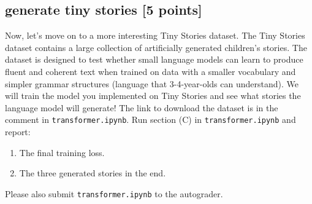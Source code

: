 \documentclass[lang=cn,11pt]{elegantbook}
\begin{document}
\subsection*{generate tiny stories [5 points]}
Now, let's move on to a more interesting Tiny Stories dataset. The Tiny Stories dataset contains a large collection of artificially generated children's stories. The dataset is designed to test whether small language models can learn to produce fluent and coherent text when trained on data with a smaller vocabulary and simpler grammar structures (language that 3-4-year-olds can understand). We will train the model you implemented on Tiny Stories and see what stories the language model will generate! 
The link to download the dataset is in the comment in \texttt{transformer.ipynb}. Run section (C) in \texttt{transformer.ipynb} and report:
\begin{enumerate}
    \item The final training loss.
    \item The three generated stories in the end.
\end{enumerate}
Please also submit \texttt{transformer.ipynb} to the autograder.





\end{document}

